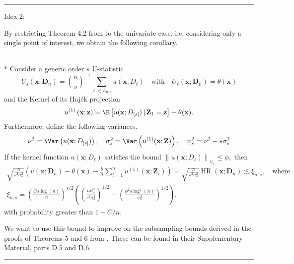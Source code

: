 \hrule

{\color{red} Idea 2:}

By restricting Theorem 4.2 from \citet{ritzwoller_uniform_2024} to the univariate case, i.e. considering only a single point of interest, we obtain the following corollary.
\begin{cor}\mbox{}\\*
	Consider a generic order $s$ U-statistic
	\begin{equation}
		U_{s}(\mathbf{x}; \mathbf{D}_n)
		= \binom{n}{s}^{-1} \sum_{\ell \in L_{n,s}}u(\mathbf{x}; D_{\ell})
		\quad \text{with} \quad
		U_{s}(\mathbf{x}; \mathbf{D}_n) = \theta(\mathbf{x})
	\end{equation}
	and the Kernel of its Haj\'ek projection
	\begin{equation}
		u^{(1)}\left(\mathbf{x}; \mathbf{z}\right)
		= \E\left[u(\mathbf{x}; D_{[s]}) \, | \, \mathbf{Z}_1 = \mathbf{z}\right] - \theta(\mathbf{x}).
	\end{equation}
	Furthermore, define the following variances.
	\begin{equation}
		\nu^2 = \Var\left(u(\mathbf{x}; D_{[s]})\right), \quad
		\sigma_{s}^2 = \Var\left(u^{(1)}(\mathbf{x}; \mathbf{Z})\right), \quad
		\psi_{s}^2 = \nu^2 - s \sigma_{s}^2
	\end{equation}
	If the kernel function $u\left(\mathbf{x} ; D_{\ell}\right)$ satisfies the bound
	$\left\|u(\mathbf{x}; D_{\ell})\right\|_{\psi_1} \leq \phi,$
	then
	\begin{align}
		\sqrt{\frac{n}{{s}^2 \sigma_{s}^2}}
		\left(u(\mathbf{x}; \mathbf{D}_n) - \theta(\mathbf{x}) - \frac{b}{n} \sum_{i=1}^n u^{(1)}(\mathbf{x}; \mathbf{Z}_{i})\right)
		= \sqrt{\frac{n}{{s}^2 \sigma_{s}^2}} \operatorname{HR}(\mathbf{x}; \mathbf{D}_n)
		\lesssim \xi_{n, s},
		\quad \text {where} \\
		\xi_{n, s}
		= \left(\frac{C s \log(n)}{n}\right)^{s / 2}\left(\left(\frac{n \psi_{s}^2}{{s}^2 \sigma_{s}^2}\right)^{1 / 2}+\left(\frac{\phi^2 s \log ^4(n)}{\sigma_{s}^2}\right)^{1 / 2}\right),
	\end{align}
	with probability greater than $1-C / n$.
\end{cor}

We want to use this bound to improve on the subsampling bounds derived in the proofs of Theorems 5 and 6 from \cite{demirkaya_optimal_2024}.
These can be found in their Supplementary Material, parts D.5 and D.6.

\hrule

